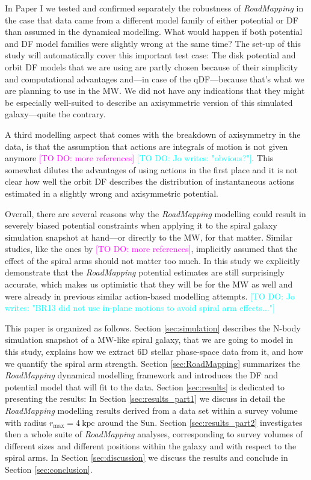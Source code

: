 \documentclass[iop,revtex4,numberedappendix,appendixfloats]{emulateapj}
\newcommand{\RM}{{\sl RoadMapping}}
\newcommand{\Wilma}[1]{\textcolor{Magenta}{#1}}
\newcommand{\Jo}[1]{\textcolor{Cyan}{#1}}
\begin{document}
In Paper I we tested and confirmed separately the robustness of \RM{} in the case that data came from a different model family of either potential or DF than assumed in the dynamical modelling. What would happen if both potential and DF model families were slightly wrong at the same time? The set-up of this study will automatically cover this important test case: The disk potential and orbit DF models that we are using are partly chosen because of their simplicity and computational advantages and---in case of the qDF---because that's what we are planning to use in the MW. We did not have any indications that they might be especially well-suited to describe an axisymmetric version of this simulated galaxy---quite the contrary.

A third modelling aspect that comes with the breakdown of axisymmetry in the data, is that the assumption that actions are integrals of motion is not given anymore \citep{2016ApJ...824...39V} \Wilma{[TO DO: more references]} \Jo{[TO DO: Jo writes: "obvious?"]}. This somewhat dilutes the advantages of using actions in the first place and it is not clear how well the orbit DF describes the distribution of instantaneous actions estimated in a slightly wrong and axisymmetric potential.

Overall, there are several reasons why the \RM{} modelling could result in severely biased potential constraints when applying it to the spiral galaxy simulation snapshot at hand---or directly to the MW, for that matter. Similar studies, like the ones by \citet{2013ApJ...779..115B,2014MNRAS.445.3133P,2015MNRAS.449.3479S} \Wilma{[TO DO: more references]}, implicitly assumed that the effect of the spiral arms should not matter too much. In this study we explicitly demonstrate that the \RM{} potential estimates are still surprisingly accurate, which makes us optimistic that they will be for the MW as well and were already in previous similar action-based modelling attempts. \Jo{[TO DO: Jo writes: "BR13 did not use in-plane motions to avoid spiral arm effects..."]}

This paper is organized as follows. Section \ref{sec:simulation} describes the N-body simulation snapshot of a MW-like spiral galaxy, that we are going to model in this study, explains how we extract 6D stellar phase-space data from it, and how we quantify the spiral arm strength. Section \ref{sec:RoadMapping} summarizes the \RM{} dynamical modelling framework and introduces the DF and potential model that will fit to the data. Section \ref{sec:results} is dedicated to presenting the results: In Section \ref{sec:results_part1} we discuss in detail the \RM{} modelling results derived from a data set within a survey volume with radius $r_\text{max}=4~\text{kpc}$ around the Sun. Section \ref{sec:results_part2} investigates then a whole suite of \RM{} analyses, corresponding to survey volumes of different sizes and different positions within the galaxy and with respect to the spiral arms. In Section \ref{sec:discussion} we discuss the results and conclude in Section \ref{sec:conclusion}.
\end{document}
